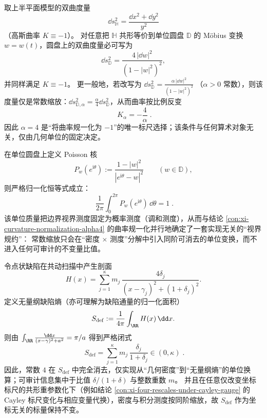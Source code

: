 \begin{proposition}\label{con:xi-curvature-normalization-alpha4}
取上半平面模型的双曲度量
\[
\dd s_{\mathbb{H}}^{2}=\frac{\dd x^{2}+\dd y^{2}}{y^{2}}
\]
（高斯曲率 \(K\equiv -1\)）。
对任意把 \(\mathbb{H}\) 共形等价到单位圆盘 \(\mathbb{D}\) 的 Möbius 变换 \(w=w(t)\)，圆盘上的双曲度量必可写为
\[
\dd s_{\mathbb{D}}^{2}=\frac{4\,|\dd w|^{2}}{(1-|w|^{2})^{2}},
\]
并同样满足 \(K\equiv -1\)。
更一般地，若改写为
\(
\dd s_{\mathbb{D}}^{2}=\frac{\alpha\,|\dd w|^{2}}{(1-|w|^{2})^{2}}
\)
（\(\alpha>0\) 常数），则该度量仅是常数缩放：\(\dd s_{\mathbb{D},\alpha}^{2}=\frac{\alpha}{4}\dd s_{\mathbb{D}}^{2}\)，从而曲率按比例反变
\[
\boxed{\;K_{\alpha}=-\frac{4}{\alpha}\; }.
\]
因此 \(\alpha=4\) 是“将曲率规一化为 \(-1\)”的唯一标尺选择；该条件与任何算术对象无关，仅由几何单位的固定决定。
\end{proposition}

\begin{proposition}\label{con:xi-poisson-kernel-unit-mass-normalization}
在单位圆盘上定义 Poisson 核
\[
P_{w}(e^{\mathrm{i}\theta})
:=\frac{1-|w|^{2}}{|e^{\mathrm{i}\theta}-w|^{2}}
\qquad(w\in\mathbb{D}),
\]
则严格归一化恒等式成立：
\[
\boxed{\;
\frac{1}{2\pi}\int_{0}^{2\pi}P_{w}(e^{\mathrm{i}\theta})\,\dd\theta=1\; }.
\]
该单位质量把边界视界测度固定为概率测度（调和测度），从而与结论 \ref{con:xi-curvature-normalization-alpha4} 的曲率规一化并行地确定了一套实现无关的“视界规约”：
常数缩放只会在“密度 \(\times\) 测度”分解中引入同阶可消去的单位变换，而不进入任何可审计的不变量比值。
\end{proposition}

\begin{proposition}\label{con:xi-defect-entropy-coordinate_invariant}
令点状缺陷在共动扫描中产生剖面
\[
H(x)=\sum_{j=1}^{\kappa} m_j\,\frac{4\delta_j}{(x-\gamma_j)^2+(1+\delta_j)^2}.
\]
定义无量纲缺陷熵（亦可理解为缺陷通量的归一化面积）
\[
S_{\mathrm{def}}
:=\frac{1}{4\pi}\int_{\RR}H(x)\,\dd x.
\]
则由 \(\int_{\RR}\frac{\dd x}{(x-\gamma)^2+a^2}=\pi/a\) 得到严格闭式
\[
\boxed{\;
S_{\mathrm{def}}
=\sum_{j=1}^{\kappa}m_j\,\frac{\delta_j}{1+\delta_j}\in(0,\kappa)\; }.
\]
因此，常数 \(4\) 在 \(S_{\mathrm{def}}\) 中完全消去，仅实现从“几何密度”到“无量纲熵”的单位换算；可审计信息集中于比值 \(\delta/(1+\delta)\) 与整数重数 \(m\)。
并且在任意仅改变坐标标尺的共形重参数化下（例如结论 \ref{con:xi-four-rescales-under-cayley-gauge} 的 Cayley 标尺变化与相应变量代换），密度与积分测度按同阶缩放，故 \(S_{\mathrm{def}}\) 作为坐标无关的标量保持不变。
\end{proposition}

